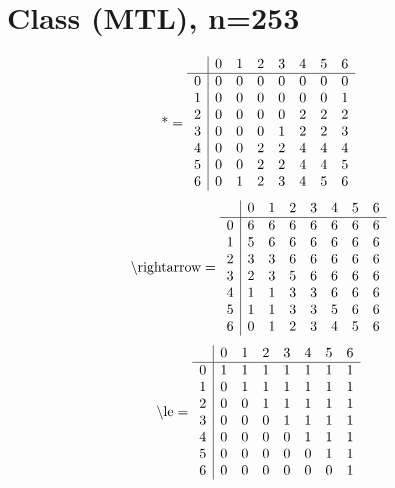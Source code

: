 \documentclass[11pt]{article}
\begin{document}
\section{Class (MTL), n=253}
\[\text{*} = 
\begin{array}{r | r r r r r r r}
 & 0 & 1 & 2 & 3 & 4 & 5 & 6 \\ \hline
0 & 0 & 0 & 0 & 0 & 0 & 0 & 0 \\
1 & 0 & 0 & 0 & 0 & 0 & 0 & 1 \\
2 & 0 & 0 & 0 & 0 & 2 & 2 & 2 \\
3 & 0 & 0 & 0 & 1 & 2 & 2 & 3 \\
4 & 0 & 0 & 2 & 2 & 4 & 4 & 4 \\
5 & 0 & 0 & 2 & 2 & 4 & 4 & 5 \\
6 & 0 & 1 & 2 & 3 & 4 & 5 & 6 \\
\end{array}
\]
\[\text{\textbackslash rightarrow} = 
\begin{array}{r | r r r r r r r}
 & 0 & 1 & 2 & 3 & 4 & 5 & 6 \\ \hline
0 & 6 & 6 & 6 & 6 & 6 & 6 & 6 \\
1 & 5 & 6 & 6 & 6 & 6 & 6 & 6 \\
2 & 3 & 3 & 6 & 6 & 6 & 6 & 6 \\
3 & 2 & 3 & 5 & 6 & 6 & 6 & 6 \\
4 & 1 & 1 & 3 & 3 & 6 & 6 & 6 \\
5 & 1 & 1 & 3 & 3 & 5 & 6 & 6 \\
6 & 0 & 1 & 2 & 3 & 4 & 5 & 6 \\
\end{array}
\]
\[\text{\textbackslash le} = 
\begin{array}{r | r r r r r r r}
 & 0 & 1 & 2 & 3 & 4 & 5 & 6 \\ \hline
0 & 1 & 1 & 1 & 1 & 1 & 1 & 1 \\
1 & 0 & 1 & 1 & 1 & 1 & 1 & 1 \\
2 & 0 & 0 & 1 & 1 & 1 & 1 & 1 \\
3 & 0 & 0 & 0 & 1 & 1 & 1 & 1 \\
4 & 0 & 0 & 0 & 0 & 1 & 1 & 1 \\
5 & 0 & 0 & 0 & 0 & 0 & 1 & 1 \\
6 & 0 & 0 & 0 & 0 & 0 & 0 & 1 \\
\end{array}
\]
\end{document}
